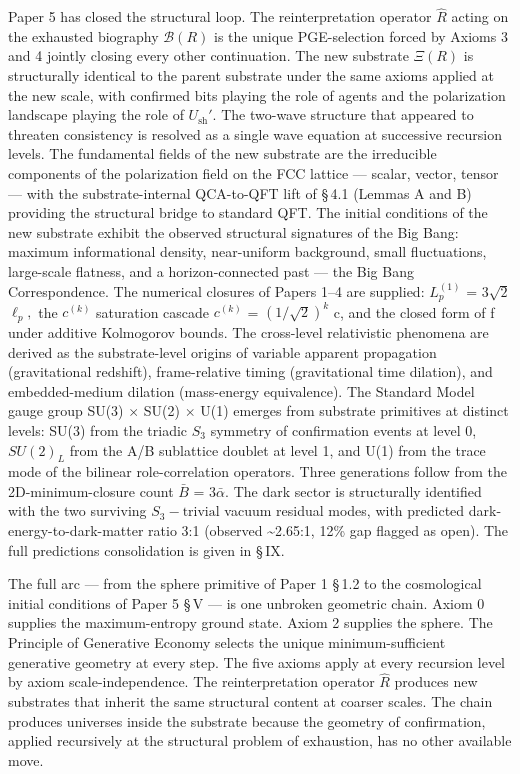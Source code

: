 \documentclass[11pt,oneside]{report}
\theoremstyle{definition}
\theoremstyle{remark}
\begin{document}
Paper 5 has closed the structural loop. The reinterpretation operator \ensuremath{\hat{R}}
acting on the exhausted biography \ensuremath{\mathcal{B}(R)} is the unique PGE-selection
forced by Axioms 3 and 4 jointly closing every other continuation. The
new substrate \ensuremath{\Xi (R)} is structurally identical to the parent substrate
under the same axioms applied at the new scale, with confirmed bits
playing the role of agents and the polarization landscape playing the
role of \ensuremath{U_{\mathrm{sh}}'.} The two-wave structure that appeared to threaten
consistency is resolved as a single wave equation at successive
recursion levels. The fundamental fields of the new substrate are the
irreducible components of the polarization field on the FCC lattice ---
scalar, vector, tensor --- with the substrate-internal QCA-to-QFT lift
of \S\,4.1 (Lemmas A and B) providing the structural bridge to standard
QFT. The initial conditions of the new substrate exhibit the observed
structural signatures of the Big Bang: maximum informational density,
near-uniform background, small fluctuations, large-scale flatness, and a
horizon-connected past --- the Big Bang Correspondence. The numerical
closures of Papers 1--4 are supplied: \ensuremath{L_{p}^{(1)}} = \ensuremath{3\sqrt{2}} \ensuremath{\ell_{p},} the \ensuremath{c^{(k)}}
saturation cascade \ensuremath{c^{(k)}} = \ensuremath{(1/\sqrt{2})^{k}} c, and the closed form of f
under additive Kolmogorov bounds. The cross-level relativistic phenomena
are derived as the substrate-level origins of variable apparent
propagation (gravitational redshift), frame-relative timing
(gravitational time dilation), and embedded-medium dilation (mass-energy
equivalence). The Standard Model gauge group SU(3) \ensuremath{\times} SU(2) \ensuremath{\times} U(1)
emerges from substrate primitives at distinct levels: SU(3) from the
triadic \ensuremath{S_{3}} symmetry of confirmation events at level 0, \ensuremath{SU(2)_{L}} from the
A/B sublattice doublet at level 1, and U(1) from the trace mode of the
bilinear role-correlation operators. Three generations follow from the
2D-minimum-closure count \ensuremath{\bar{B}} = \ensuremath{3\bar{\alpha}.} The dark sector is structurally
identified with the two surviving \ensuremath{S_{3}-\text{trivial}} vacuum residual modes, with
predicted dark-energy-to-dark-matter ratio 3:1 (observed
\textasciitilde2.65:1, 12\% gap flagged as open). The full predictions
consolidation is given in \S\,IX.

The full arc --- from the sphere primitive of Paper 1 \S\,1.2 to the
cosmological initial conditions of Paper 5 \S\,V --- is one unbroken
geometric chain. Axiom 0 supplies the maximum-entropy ground state.
Axiom 2 supplies the sphere. The Principle of Generative Economy selects
the unique minimum-sufficient generative geometry at every step. The
five axioms apply at every recursion level by axiom scale-independence.
The reinterpretation operator \ensuremath{\hat{R}} produces new substrates that inherit the
same structural content at coarser scales. The chain produces universes
inside the substrate because the geometry of confirmation, applied
recursively at the structural problem of exhaustion, has no other
available move.
\end{document}
